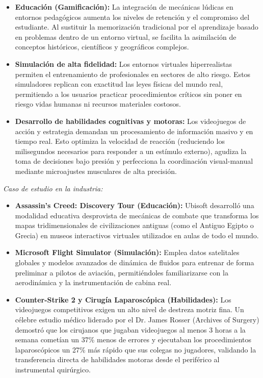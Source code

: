 \documentclass[12pt]{report}
\begin{document}
\begin{itemize}
    \item \textbf{Educación (Gamificación):} La integración de mecánicas lúdicas en entornos pedagógicos aumenta los niveles de retención y el compromiso del estudiante. Al sustituir la memorización tradicional por el aprendizaje basado en problemas dentro de un entorno virtual, se facilita la asimilación de conceptos históricos, científicos y geográficos complejos.
    \item \textbf{Simulación de alta fidelidad:} Los entornos virtuales hiperrealistas permiten el entrenamiento de profesionales en sectores de alto riesgo. Estos simuladores replican con exactitud las leyes físicas del mundo real, permitiendo a los usuarios practicar procedimientos críticos sin poner en riesgo vidas humanas ni recursos materiales costosos.
    \item \textbf{Desarrollo de habilidades cognitivas y motoras:} Los videojuegos de acción y estrategia demandan un procesamiento de información masivo y en tiempo real. Esto optimiza la velocidad de reacción (reduciendo los milisegundos necesarios para responder a un estímulo externo), agudiza la toma de decisiones bajo presión y perfecciona la coordinación visual-manual mediante microajustes musculares de alta precisión.
\end{itemize}

\textit{Caso de estudio en la industria:}
\begin{itemize}
    \item \textbf{Assassin's Creed: Discovery Tour (Educación):} Ubisoft desarrolló una modalidad educativa desprovista de mecánicas de combate que transforma los mapas tridimensionales de civilizaciones antiguas (como el Antiguo Egipto o Grecia) en museos interactivos virtuales utilizados en aulas de todo el mundo.
    \item \textbf{Microsoft Flight Simulator (Simulación):} Emplea datos satelitales globales y modelos avanzados de dinámica de fluidos para entrenar de forma preliminar a pilotos de aviación, permitiéndoles familiarizarse con la aerodinámica y la instrumentación de cabina real.
    \item \textbf{Counter-Strike 2 y Cirugía Laparoscópica (Habilidades):} Los videojuegos competitivos exigen un alto nivel de destreza motriz fina. Un célebre estudio médico liderado por el Dr. James Rosser (Archives of Surgery) demostró que los cirujanos que jugaban videojuegos al menos 3 horas a la semana cometían un 37\% menos de errores y ejecutaban los procedimientos laparoscópicos un 27\% más rápido que sus colegas no jugadores, validando la transferencia directa de habilidades motoras desde el periférico al instrumental quirúrgico.
\end{itemize}
\end{document}
